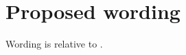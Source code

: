 \documentclass{wg21}
\begin{document}
%
%
%
%
%
%
%
%
%
%
%
%
%

\section{Proposed wording}

Wording is relative to \cite{N4885}.
\end{document}
